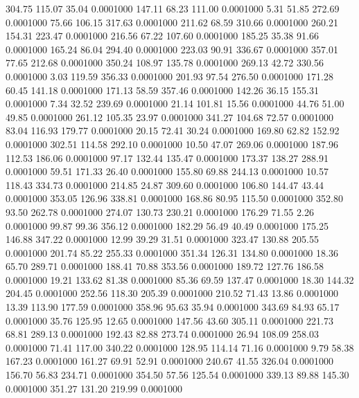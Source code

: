  304.75  115.07   35.04   0.0001000
 147.11   68.23  111.00   0.0001000
   5.31   51.85  272.69   0.0001000
  75.66  106.15  317.63   0.0001000
 211.62   68.59  310.66   0.0001000
 260.21  154.31  223.47   0.0001000
 216.56   67.22  107.60   0.0001000
 185.25   35.38   91.66   0.0001000
 165.24   86.04  294.40   0.0001000
 223.03   90.91  336.67   0.0001000
 357.01   77.65  212.68   0.0001000
 350.24  108.97  135.78   0.0001000
 269.13   42.72  330.56   0.0001000
   3.03  119.59  356.33   0.0001000
 201.93   97.54  276.50   0.0001000
 171.28   60.45  141.18   0.0001000
 171.13   58.59  357.46   0.0001000
 142.26   36.15  155.31   0.0001000
   7.34   32.52  239.69   0.0001000
  21.14  101.81   15.56   0.0001000
  44.76   51.00   49.85   0.0001000
 261.12  105.35   23.97   0.0001000
 341.27  104.68   72.57   0.0001000
  83.04  116.93  179.77   0.0001000
  20.15   72.41   30.24   0.0001000
 169.80   62.82  152.92   0.0001000
 302.51  114.58  292.10   0.0001000
  10.50   47.07  269.06   0.0001000
 187.96  112.53  186.06   0.0001000
  97.17  132.44  135.47   0.0001000
 173.37  138.27  288.91   0.0001000
  59.51  171.33   26.40   0.0001000
 155.80   69.88  244.13   0.0001000
  10.57  118.43  334.73   0.0001000
 214.85   24.87  309.60   0.0001000
 106.80  144.47   43.44   0.0001000
 353.05  126.96  338.81   0.0001000
 168.86   80.95  115.50   0.0001000
 352.80   93.50  262.78   0.0001000
 274.07  130.73  230.21   0.0001000
 176.29   71.55    2.26   0.0001000
  99.87   99.36  356.12   0.0001000
 182.29   56.49   40.49   0.0001000
 175.25  146.88  347.22   0.0001000
  12.99   39.29   31.51   0.0001000
 323.47  130.88  205.55   0.0001000
 201.74   85.22  255.33   0.0001000
 351.34  126.31  134.80   0.0001000
  18.36   65.70  289.71   0.0001000
 188.41   70.88  353.56   0.0001000
 189.72  127.76  186.58   0.0001000
  19.21  133.62   81.38   0.0001000
  85.36   69.59  137.47   0.0001000
  18.30  144.32  204.45   0.0001000
 252.56  118.30  205.39   0.0001000
 210.52   71.43   13.86   0.0001000
  13.39  113.90  177.59   0.0001000
 358.96   95.63   35.94   0.0001000
 343.69   84.93   65.17   0.0001000
  35.76  125.95   12.65   0.0001000
 147.56   43.60  305.11   0.0001000
 221.73   68.81  289.13   0.0001000
 192.43   82.88  273.74   0.0001000
  26.94  108.09  258.03   0.0001000
  71.41  117.00  340.22   0.0001000
 128.95  114.14   71.16   0.0001000
   9.79   58.38  167.23   0.0001000
 161.27   69.91   52.91   0.0001000
 240.67   41.55  326.04   0.0001000
 156.70   56.83  234.71   0.0001000
 354.50   57.56  125.54   0.0001000
 339.13   89.88  145.30   0.0001000
 351.27  131.20  219.99   0.0001000
